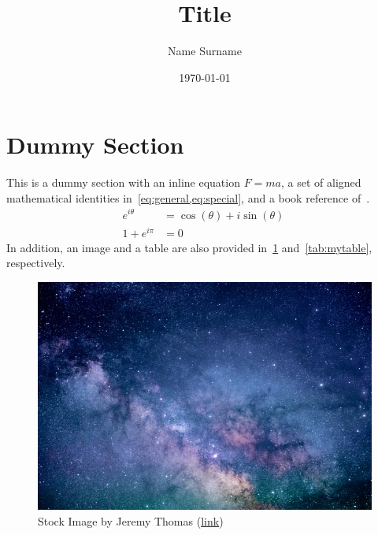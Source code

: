 \documentclass[a4paper,11pt]{article}
\title{Title}
\author{Name Surname}
\date{\today}
\newcommand{\IM}{i} %
\newcommand{\EXP}[1]{e^{#1}} %
\begin{document}
\maketitle

\section{Dummy Section}
This is a dummy section with an inline equation \(F = ma\), a set of
aligned mathematical identities in~\cref{eq:general,eq:special}, and
a book reference of~\autocite{knuth1997art}.
\begin{align}
	\EXP{\IM\theta}  & = \cos(\theta)+\IM\sin(\theta)~\label{eq:general} \\
	1 + \EXP{\IM\pi} & = 0~\label{eq:special}
\end{align}
In addition, an image and a table are also provided in~\cref{fig:space}
and~\cref{tab:mytable}, respectively.
\begin{figure}[h]
	\centering{}
	\includegraphics[width=0.5\linewidth]{images/space.jpg}
	\caption{Stock Image by Jeremy Thomas
		(\href{https://bit.ly/3AUuKM7}{link})}\label{fig:space}
\end{figure}


\printbibliography{}
\end{document}

